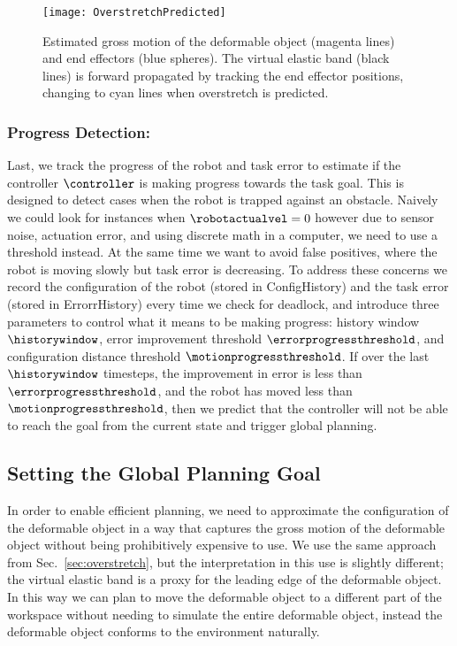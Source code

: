 \begin{figure}
    \centering
    \texttt{[image: OverstretchPredicted]}
    \caption{Estimated gross motion of the deformable object (magenta lines) and end effectors (blue spheres). The virtual elastic band (black lines) is forward propagated by tracking the end effector positions, changing to cyan lines when overstretch is predicted.}
    \label{fig:overstretch_predicted}
\end{figure}







\subsubsection{Progress Detection:}

Last, we track the progress of the robot and task error to estimate if the controller $\controller$ is making progress towards the task goal. This is designed to detect cases when the robot is trapped against an obstacle. Naively we could look for instances when $\robotactualvel = 0$ however due to sensor noise, actuation error, and using discrete math in a computer, we need to use a threshold instead. At the same time we want to avoid false positives, where the robot is moving slowly but task error is decreasing. To address these concerns we record the configuration of the robot (stored in ConfigHistory) and the task error (stored in ErrorrHistory) every time we check for deadlock, and introduce three parameters to control what it means to be making progress: history window $\historywindow$, error improvement threshold $\errorprogressthreshold$, and configuration distance threshold $\motionprogressthreshold$. If over the last $\historywindow$ timesteps, the improvement in error is less than $\errorprogressthreshold$, and the robot has moved less than $\motionprogressthreshold$, then we predict that the controller will not be able to reach the goal from the current state and trigger global planning.



\subsection{Setting the Global Planning Goal}
\label{sec:planning_goal}


In order to enable efficient planning, we need to approximate the configuration of the deformable object in a way that captures the gross motion of the deformable object without being prohibitively expensive to use. We use the same approach from Sec.~\ref{sec:overstretch}, but the interpretation in this use is slightly different; the virtual elastic band is a proxy for the leading edge of the deformable object. In this way we can plan to move the deformable object to a different part of the workspace without needing to simulate the entire deformable object, instead the deformable object conforms to the environment naturally.



